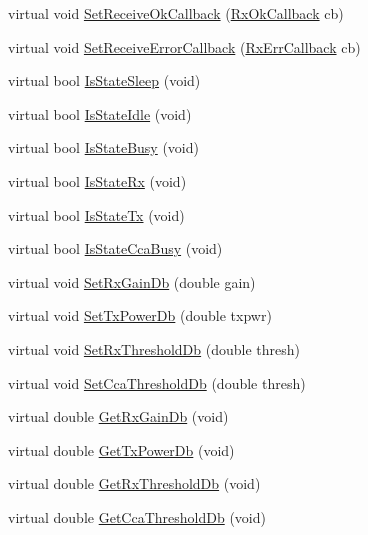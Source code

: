 \begin{DoxyCompactItemize}
\item 
virtual void \hyperlink{classns3_1_1UanPhyGen_a9dbf6b178b5862a8a0e7b3bd679836cf}{Set\+Receive\+Ok\+Callback} (\hyperlink{classns3_1_1UanPhy_a0b4ce695657b1c0b7f52ae474f3d98f9}{Rx\+Ok\+Callback} cb)
\item 
virtual void \hyperlink{classns3_1_1UanPhyGen_ad920b4b229bfc8f2a55bf7c0a4e9c5e8}{Set\+Receive\+Error\+Callback} (\hyperlink{classns3_1_1UanPhy_ae0da6892a65ba998fb1d649f31b118c4}{Rx\+Err\+Callback} cb)
\item 
virtual bool \hyperlink{classns3_1_1UanPhyGen_a750fcee24822fe3c48637902d90026fa}{Is\+State\+Sleep} (void)
\item 
virtual bool \hyperlink{classns3_1_1UanPhyGen_acf942d88af2bd02cb86c662aba065392}{Is\+State\+Idle} (void)
\item 
virtual bool \hyperlink{classns3_1_1UanPhyGen_afd6fc0469a31ff6075efeb643ff5e2ca}{Is\+State\+Busy} (void)
\item 
virtual bool \hyperlink{classns3_1_1UanPhyGen_a3279048c032ebc9e78462d5060986546}{Is\+State\+Rx} (void)
\item 
virtual bool \hyperlink{classns3_1_1UanPhyGen_ac32922729e6f6e487a054e18b7ae16d6}{Is\+State\+Tx} (void)
\item 
virtual bool \hyperlink{classns3_1_1UanPhyGen_a9e1964f505067cf532223c86648a9b41}{Is\+State\+Cca\+Busy} (void)
\item 
virtual void \hyperlink{classns3_1_1UanPhyGen_ade7c205d9c2280547e6331f12952a491}{Set\+Rx\+Gain\+Db} (double gain)
\item 
virtual void \hyperlink{classns3_1_1UanPhyGen_a972ee2c7472106dd2753423258203771}{Set\+Tx\+Power\+Db} (double txpwr)
\item 
virtual void \hyperlink{classns3_1_1UanPhyGen_a238b286d4aeea10cfdbc734dca2e61a0}{Set\+Rx\+Threshold\+Db} (double thresh)
\item 
virtual void \hyperlink{classns3_1_1UanPhyGen_acb9544b31e494617f663d992e7fd658b}{Set\+Cca\+Threshold\+Db} (double thresh)
\item 
virtual double \hyperlink{classns3_1_1UanPhyGen_ac13681c4c3fa3a65394b819523aa3c4a}{Get\+Rx\+Gain\+Db} (void)
\item 
virtual double \hyperlink{classns3_1_1UanPhyGen_aa28e3ee110e22c743d29c53fa97ea1b7}{Get\+Tx\+Power\+Db} (void)
\item 
virtual double \hyperlink{classns3_1_1UanPhyGen_af5933ffcbcef37280f748efd93e8dba7}{Get\+Rx\+Threshold\+Db} (void)
\item 
virtual double \hyperlink{classns3_1_1UanPhyGen_ad289d2480b8058af3271c04979022a76}{Get\+Cca\+Threshold\+Db} (void)

\end{DoxyCompactItemize}
